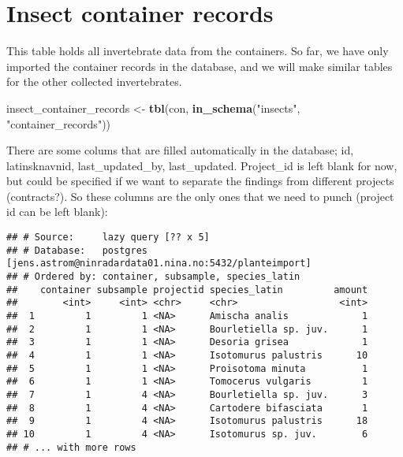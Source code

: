 \documentclass[]{article}
\newenvironment{Shaded}{\begin{snugshade}}{\end{snugshade}}
\newcommand{\KeywordTok}[1]{\textcolor[rgb]{0.13,0.29,0.53}{\textbf{#1}}}
\newcommand{\NormalTok}[1]{#1}
\newcommand{\OperatorTok}[1]{\textcolor[rgb]{0.81,0.36,0.00}{\textbf{#1}}}
\newcommand{\StringTok}[1]{\textcolor[rgb]{0.31,0.60,0.02}{#1}}
\begin{document}
\hypertarget{insect-container-records}{%
\section{Insect container records}\label{insect-container-records}}

This table holds all invertebrate data from the containers. So far, we
have only imported the container records in the database, and we will
make similar tables for the other collected invertebrates.

\begin{Shaded}
\begin{Highlighting}[]
\NormalTok{insect_container_records <-}\StringTok{ }\KeywordTok{tbl}\NormalTok{(con, }\KeywordTok{in_schema}\NormalTok{(}\StringTok{"insects"}\NormalTok{, }\StringTok{"container_records"}\NormalTok{))}
\end{Highlighting}
\end{Shaded}

There are some colums that are filled automatically in the database; id,
latinsknavnid, last\_updated\_by, last\_updated. Project\_id is left
blank for now, but could be specified if we want to separate the
findings from different projects (contracts?). So these columns are the
only ones that we need to punch (project id can be left blank):

\begin{Shaded}
\end{Shaded}

\begin{verbatim}
## # Source:     lazy query [?? x 5]
## # Database:   postgres [jens.astrom@ninradardata01.nina.no:5432/planteimport]
## # Ordered by: container, subsample, species_latin
##    container subsample projectid species_latin         amount
##        <int>     <int> <chr>     <chr>                  <int>
##  1         1         1 <NA>      Amischa analis             1
##  2         1         1 <NA>      Bourletiella sp. juv.      1
##  3         1         1 <NA>      Desoria grisea             1
##  4         1         1 <NA>      Isotomurus palustris      10
##  5         1         1 <NA>      Proisotoma minuta          1
##  6         1         1 <NA>      Tomocerus vulgaris         1
##  7         1         4 <NA>      Bourletiella sp. juv.      3
##  8         1         4 <NA>      Cartodere bifasciata       1
##  9         1         4 <NA>      Isotomurus palustris      18
## 10         1         4 <NA>      Isotomurus sp. juv.        6
## # ... with more rows
\end{verbatim}
\end{document}
